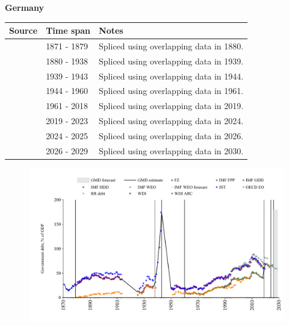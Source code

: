 \documentclass[12pt,a4paper,landscape]{article}
\begin{document}
\begin{adjustbox}{max totalsize={\paperwidth}{\paperheight},center}
\begin{minipage}[t][\textheight][t]{\textwidth}
\vspace*{0.5cm}
{}
\begin{center}
{\Large\bfseries Germany}
\end{center}
\vspace{0.5cm}
\begin{table}[H]
\centering
\small
\begin{tabular}{|l|l|l|}
\hline
\textbf{Source} & \textbf{Time span} & \textbf{Notes} \\
\hline
\rowcolor{white}\cite{JST}& 1871 - 1879 &Spliced using overlapping data in 1880.\\
\rowcolor{lightgray}\cite{IMF_FPP}& 1880 - 1938 &Spliced using overlapping data in 1939.\\
\rowcolor{white}\cite{JST}& 1939 - 1943 &Spliced using overlapping data in 1944.\\
\rowcolor{lightgray}\cite{IMF_FPP}& 1944 - 1960 &Spliced using overlapping data in 1961.\\
\rowcolor{white}\cite{IMF_GDD}& 1961 - 2018 &Spliced using overlapping data in 2019.\\
\rowcolor{lightgray}\cite{IMF_FPP}& 2019 - 2023 &Spliced using overlapping data in 2024.\\
\rowcolor{white}\cite{OECD_EO}& 2024 - 2025 &Spliced using overlapping data in 2026.\\
\rowcolor{lightgray}\cite{IMF_WEO_forecast}& 2026 - 2029 &Spliced using overlapping data in 2030.\\
\hline
\end{tabular}
\end{table}
\begin{figure}[H]
\centering
\includegraphics[width=\textwidth,height=0.6\textheight,keepaspectratio]{graphs/DEU_govdebt_GDP.pdf}
\end{figure}
\end{minipage}
\end{adjustbox}
\end{document}
